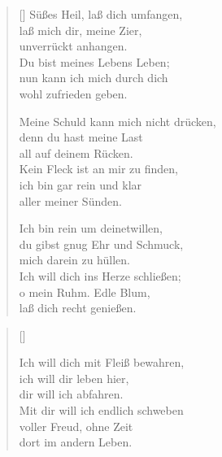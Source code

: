 \begin{multicols}{2}
\begin{verse}[\versewidth]
 Süßes Heil, laß dich umfangen,\\
laß mich dir, meine Zier,\\
unverrückt anhangen.\\
Du bist meines Lebens Leben;\\
nun kann ich mich durch dich\\
wohl zufrieden geben.

 Meine Schuld kann mich nicht drücken,\\
denn du hast meine Last\\
all auf deinem Rücken.\\
Kein Fleck ist an mir zu finden,\\
ich bin gar rein und klar\\
aller meiner Sünden.
 
 Ich bin rein um deinetwillen,\\
du gibst gnug Ehr und Schmuck,\\
mich darein zu hüllen.\\
Ich will dich ins Herze schließen;\\
o mein Ruhm. Edle Blum,\\
laß dich recht genießen.

\end{verse}
\end{multicols}

\begin{center}
\settowidth{\versewidth}{Ich will dich mit Fleiß bewahren,}
\begin{verse}[\versewidth]

 Ich will dich mit Fleiß bewahren,\\ %
ich will dir leben hier,\\
dir will ich abfahren.\\
Mit dir will ich endlich schweben\\
voller Freud, ohne Zeit\\
dort im andern Leben.
  
\end{verse}
\end{center}
 



